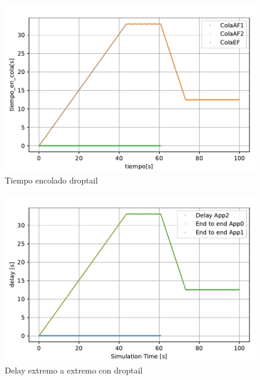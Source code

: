 \begin{figure}[!ht]
    \centering
    \includegraphics{graficas/DropTail/tiempo_en_cola_droptail.pdf}
    \caption{Tiempo encolado droptail}
    \label{fig:droptail_time}
\end{figure}

\begin{figure}
    \centering
    \includegraphics{graficas/DropTail/delay_DT.pdf}
    \caption{Delay extremo a extremo con droptail}
    \label{fig:sinqos_pktreceived99100}
\end{figure}

